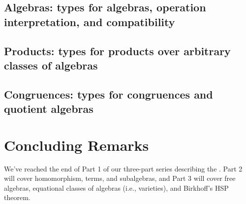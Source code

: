 \documentclass[a4paper,UKenglish,cleveref,autoref,thm-restate,12pt]{../lipics-v2021-wjd}
\begin{document}
\subsection{Algebras: types for algebras, operation interpretation, and compatibility}\label{sec:algebras}


\subsection{Products: types for products over arbitrary classes of algebras}\label{sec:product-algebras}


\subsection{Congruences: types for congruences and quotient algebras}\label{congruences}




\section{Concluding Remarks}\label{sec:concluding-remarks}
We've reached the end of Part 1 of our three-part series describing the \agdaualib.  Part 2 will cover homomorphism, terms, and subalgebras, and Part 3 will cover free algebras, equational classes of algebras (i.e., varieties), and Birkhoff's HSP theorem.


\end{document}
